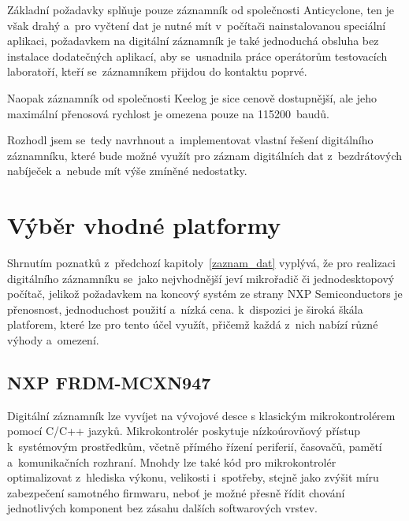 Základní požadavky splňuje pouze záznamník od společnosti Anticyclone, ten je však drahý a~pro vyčtení dat je nutné mít v~počítači nainstalovanou speciální aplikaci, požadavkem na digitální záznamník je také jednoduchá obsluha bez instalace dodatečných aplikací, aby se~usnadnila práce operátorům testovacích laboratoří, kteří se~záznamníkem přijdou do kontaktu poprvé. 

Naopak záznamník od společnosti Keelog je sice cenově dostupnější, ale jeho maximální přenosová rychlost je omezena pouze na 115200~baudů.

Rozhodl jsem se~tedy navrhnout a~implementovat vlastní řešení digitálního záznamníku, které bude možné využít pro záznam digitálních dat z~bezdrátových nabíječek a~nebude mít výše zmíněné nedostatky.

\section{Výběr vhodné platformy}
\label{vyber_vhodne_platformy}
Shrnutím poznatků z~předchozí kapitoly~\ref{zaznam_dat} vyplývá, že pro realizaci digitálního záznamníku se~jako nejvhodnější jeví mikrořadič či jednodesktopový počítač, jelikož požadavkem na koncový systém ze strany NXP Semiconductors je přenosnost, jednoduchost použití a~nízká cena. k~dispozici je široká škála platforem, které lze pro tento účel využít, přičemž každá z~nich nabízí různé výhody a~omezení.

\subsection{NXP FRDM-MCXN947}
\label{nxp_frdm_mcxn947}
Digitální záznamník lze vyvíjet na vývojové desce s klasickým mikrokontrolérem pomocí C/C++ jazyků. Mikrokontrolér poskytuje nízkoúrovňový přístup k~systémovým prostředkům, včetně přímého řízení periferií, časovačů, pamětí a~komunikačních rozhraní. Mnohdy lze také kód pro mikrokontrolér optimalizovat z~hlediska výkonu, velikosti i~spotřeby, stejně jako zvýšit míru zabezpečení samotného firmwaru, neboť je možné přesně řídit chování jednotlivých komponent bez zásahu dalších softwarových vrstev.

